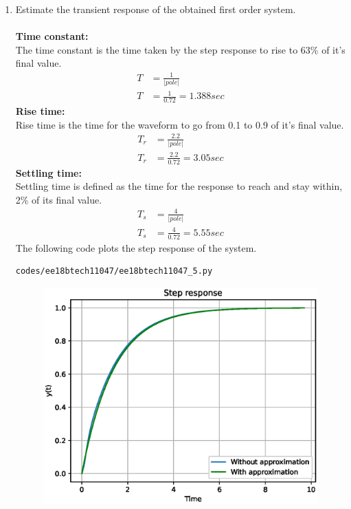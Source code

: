 \begin{enumerate}[label=\thesubsection.\arabic*.,ref=\thesubsection.\theenumi]
\item Estimate the transient response of the obtained first order system.\\
\solution\\
\textbf{Time constant:}\\
The time constant is the time taken by the step response to rise to 63\% of it's final value.
\begin{align}
T &= \frac{1}{|pole|}\\
T &= \frac{1}{0.72} = 1.388 sec
\end{align}
\textbf{Rise time:}\\
Rise time is the time for the waveform to go from 0.1 to 0.9 of it's final value.
\begin{align}
T_{r} &= \frac{2.2}{|pole|}\\
T_{r} &= \frac{2.2}{0.72} = 3.05 sec
\end{align}
\textbf{Settling time:}\\
Settling time is defined as the time for the response to reach and stay within, 2\% of its final value.
\begin{align}
T_{s} &= \frac{4}{|pole|}\\
T_{s} &= \frac{4}{0.72}=5.55 sec
\end{align}
The following code plots the step response of the system.
\begin{lstlisting}
codes/ee18btech11047/ee18btech11047_5.py
\end{lstlisting}
\begin{figure}[!ht]
\centering
\includegraphics[width=\columnwidth]{./figs/ee18btech11047/ee18btech11047_4.eps}
\caption{}
\label{fig:ee18btech11047_4}
\end{figure}
\end{enumerate}
